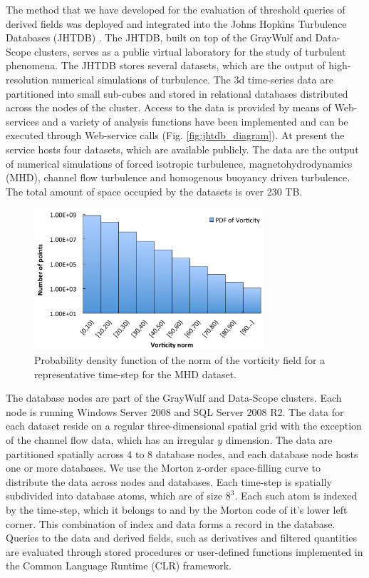 \documentclass{sig-alternate}
\begin{document}
The method that we have developed for the evaluation of threshold queries of derived fields was deployed and integrated into the 
Johns Hopkins Turbulence Databases (JHTDB) \cite{Yi, Perlman}. The JHTDB, built on top of the GrayWulf and Data-Scope clusters, serves as a public
virtual laboratory for
the study of turbulent phenomena. The JHTDB stores several datasets, which are the output of high-resolution numerical simulations of turbulence.
The 3d time-series data are partitioned into small sub-cubes and stored in relational databases distributed across the nodes of the cluster.
Access to the data is provided by means of Web-services and a variety of analysis functions have been
implemented and can be executed through Web-service calls (Fig. \ref{fig:jhtdb_diagram}).
At present the service hosts four datasets, which are available publicly. 
The data are the output of numerical simulations of forced isotropic turbulence, magnetohydrodynamics (MHD), channel 
flow turbulence and homogenous buoyancy driven turbulence.
The total amount of space occupied by the datasets is over 230 TB. 

\begin{figure}
\centering
\includegraphics[width=3.35in]{Figures/pdf.pdf}
\caption{Probability density function of the norm of the vorticity field for a representative time-step for the MHD dataset.}
\label{fig:pdf}
\end{figure}

The database nodes are part of the GrayWulf \cite{Szalay} and Data-Scope \cite{DataScope} clusters. Each node
is running Windows Server 2008 and SQL Server 2008 R2. The data for each dataset reside on a regular three-dimensional spatial grid with the
exception of the channel flow data, which has an irregular $y$ dimension. The data are partitioned spatially across 4 to 8
database nodes, and each database node hosts one or more databases. We use the Morton z-order space-filling
curve to distribute the data across nodes and databases. Each time-step is spatially subdivided
into database atoms, which are of size $8^3$. Each such atom is indexed by the time-step, which it belongs to and
by the Morton code of it's lower left corner. This combination of index and data forms a record in the database.
Queries to the data and derived fields, such as derivatives and filtered quantities are evaluated through
stored procedures or user-defined functions implemented in the Common Language Runtime (CLR) framework.
\end{document}
